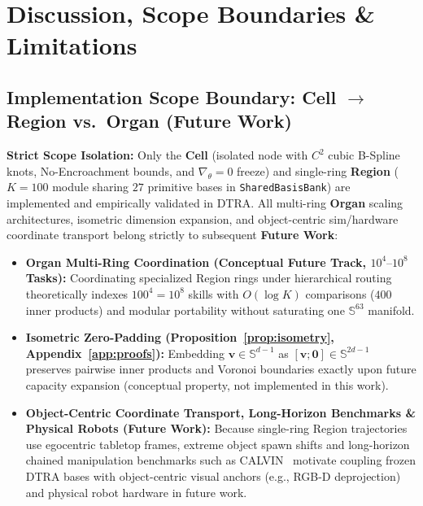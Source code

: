 \documentclass[10pt]{article}
\begin{document}
\section{Discussion, Scope Boundaries \& Limitations}
\label{sec:discussion}

\subsection{Implementation Scope Boundary: Cell \texorpdfstring{$\to$}{->} Region vs.\ Organ (Future Work)}
\textbf{Strict Scope Isolation:} Only the \textbf{Cell} (isolated node with $C^2$ cubic B-Spline knots, No-Encroachment bounds, and $\nabla_\theta=0$ freeze) and single-ring \textbf{Region} ($K=100$ module sharing $27$ primitive bases in \texttt{SharedBasisBank}) are implemented and empirically validated in DTRA. All multi-ring \textbf{Organ} scaling architectures, isometric dimension expansion, and object-centric sim/hardware coordinate transport belong strictly to subsequent \textbf{Future Work}:
\begin{itemize}[leftmargin=*,itemsep=1.5pt,topsep=2pt]
  \item \textbf{Organ Multi-Ring Coordination (Conceptual Future Track, $10^4\text{--}10^8$ Tasks):} Coordinating specialized Region rings under hierarchical routing theoretically indexes $100^4 = 10^8$ skills with $O(\log K)$ comparisons ($400$ inner products) and modular portability without saturating one $\mathbb{S}^{63}$ manifold.
  \item \textbf{Isometric Zero-Padding (Proposition~\ref{prop:isometry}, Appendix~\ref{app:proofs}):} Embedding $\mathbf{v} \in \mathbb{S}^{d-1}$ as $[\mathbf{v}; \mathbf{0}] \in \mathbb{S}^{2d-1}$ preserves pairwise inner products and Voronoi boundaries exactly upon future capacity expansion (conceptual property, not implemented in this work).
  \item \textbf{Object-Centric Coordinate Transport, Long-Horizon Benchmarks \& Physical Robots (Future Work):} Because single-ring Region trajectories use egocentric tabletop frames, extreme object spawn shifts and long-horizon chained manipulation benchmarks such as CALVIN~\cite{mees2022calvin} motivate coupling frozen DTRA bases with object-centric visual anchors (e.g., RGB-D deprojection) and physical robot hardware in future work.
\end{itemize}
\end{document}
